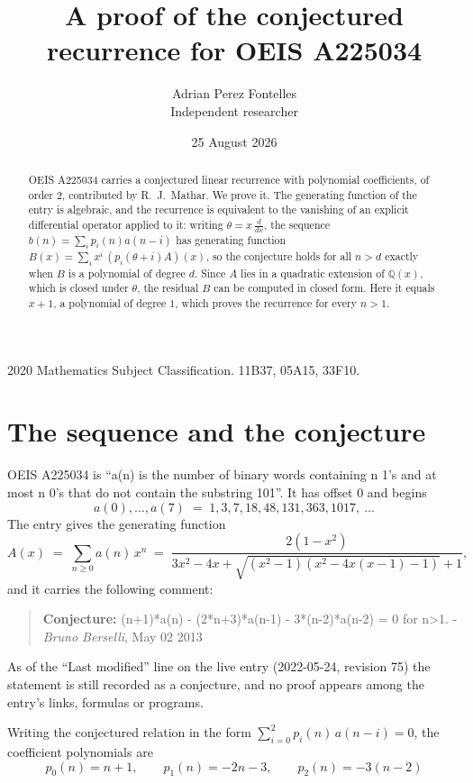 \documentclass[11pt,a4paper]{article}
\title{A proof of the conjectured recurrence for OEIS A225034}
\author{Adrian Perez Fontelles\\ \small Independent researcher}
\date{25 August 2026}
\theoremstyle{plain}
\theoremstyle{definition}
\begin{document}
\maketitle

\begin{abstract}
OEIS A225034 carries a conjectured linear recurrence with polynomial coefficients, of
order 2, contributed by R.~J.~Mathar. We prove it. The generating function of the
entry is algebraic, and the recurrence is equivalent to the vanishing of an explicit
differential operator applied to it: writing $\theta=x\,\frac{d}{dx}$, the sequence
$b(n)=\sum_{i}p_{i}(n)a(n-i)$ has generating function
$B(x)=\sum_{i}x^{i}\,(p_{i}(\theta+i)A)(x)$, so the conjecture holds for all $n>d$ exactly
when $B$ is a polynomial of degree $d$. Since $A$ lies in a quadratic extension of
$\mathbb{Q}(x)$, which is closed under $\theta$, the residual $B$ can be computed in
closed form. Here it equals $x + 1$, a polynomial of degree $1$, which proves
the recurrence for every $n>1$.
\end{abstract}

\noindent\small 2020 Mathematics Subject Classification. 11B37, 05A15, 33F10.\normalsize

\section{The sequence and the conjecture}

OEIS A225034 is ``a(n) is the number of binary words containing n 1's and at most n 0's that do not contain the substring 101''. It has offset $0$ and begins
\[
a(0),\dots,a(7)\;=\;1, 3, 7, 18, 48, 131, 363, 1017,\ \dots
\]
The entry gives the generating function
\begin{equation}\label{eq:gf}
A(x)\;=\;\sum_{n\ge 0} a(n)\,x^{n}\;=\;\frac{2 \left(1 - x^{2}\right)}{3 x^{2} - 4 x + \sqrt{\left(x^{2} - 1\right) \left(x^{2} - 4 x \left(x - 1\right) - 1\right)} + 1} ,
\end{equation}
and it carries the following comment:
\begin{quote}\small
\textbf{Conjecture:} (n+1)*a(n) - (2*n+3)*a(n-1) - 3*(n-2)*a(n-2) = 0 for n>1. - \emph{Bruno Berselli}, May 02 2013
\end{quote}
As of the ``Last modified'' line on the live entry (2022-05-24, revision 75) the
statement is still recorded as a conjecture, and no proof appears among the entry's links,
formulas or programs.

Writing the conjectured relation in the form $\sum_{i=0}^{2}p_{i}(n)\,a(n-i)=0$,
the coefficient polynomials are
\[
p_{0}(n)=n + 1,\qquad p_{1}(n)=- 2 n - 3,\qquad p_{2}(n)=- 3 \left(n - 2\right)
\]
\end{document}
